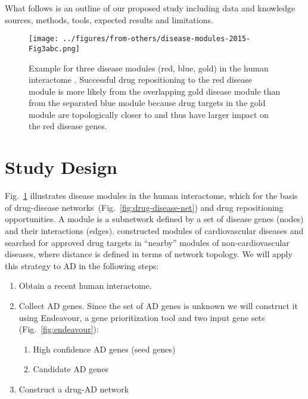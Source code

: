 \documentclass[letterpaper]{article}
\begin{document}
What follows is an outline of our proposed study including data and knowledge
sources, methods, tools, expected results and limitations.

\begin{figure}
\begin{center}
\texttt{[image: ../figures/from-others/disease-modules-2015-Fig3abc.png]}
\end{center}
\caption{Example for three disease modules (red, blue, gold) in the human
	interactome \citep{Cheng2018}.  Successful drug repositioning to the red disease module is more likely
from the overlapping gold disease module than from 
the separated blue module because drug targets in the gold module are
topologically closer to and thus have larger impact on the red disease genes.}
\label{fig:3modules}
\end{figure}

\section{Study Design}

Fig.~\ref{fig:3modules} illustrates disease modules in the human interactome,
which for the basis of drug-disease networks~(Fig.~\ref{fig:drug-disease-net})
and drug repositioning opportunities.  A module is a subnetwork defined by a
set of disease genes (nodes) and their interactions (edges). \cite{Cheng2018}
constructed modules of cardiovascular diseases and searched for approved drug
targets in ``nearby'' modules of non-cardiovascular diseases, where distance
is defined in terms of network topology.  We will apply this strategy to AD in
the following steps:

\begin{enumerate}
\item Obtain a recent human interactome.  
\item Collect AD genes.  Since the set of AD genes is unknown
	we will construct it using Endeavour, a gene prioritization tool
	\citep{Tranchevent2016} and two input gene sets
	(Fig.~\ref{fig:endeavour}):
\begin{enumerate}
	\item High confidence AD genes (seed genes)
	\item Candidate AD genes
\end{enumerate}
\item Construct a drug-AD network~\citep{Cheng2018}
\end{enumerate}
\end{document}
